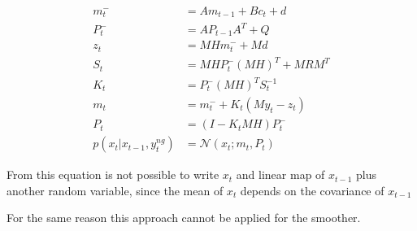 \documentclass{article}
\begin{document}
\begin{equation}\label{filter_combined}
\begin{split}
    m_t^- &= Am_{t-1} + B c_t + d\\
    P_t^- &= AP_{t-1}A^T + Q\\
    z_t &= MHm_t^- + Md\\
    S_t &= MHP_t^-(MH)^T + MRM^T\\
    K_t &= P_t^-(MH)^TS_t^{-1}\\
    m_t &= m_t^- + K_t(My_t - z_t)\\
    P_t &= (I-K_tMH)P_t^-\\
    p(x_t|x_{t-1}, y^{ng}_t) &= \mathcal{N}(x_t; m_t, P_t)
\end{split}
\end{equation}

From this equation is not possible to write $x_t$ and linear map of $x_{t-1}$ plus another random variable, since the mean of $x_t$ depends on the covariance of $x_{t-1}$ 
    
For the same reason this approach cannot be applied for the smoother.
\end{document}
